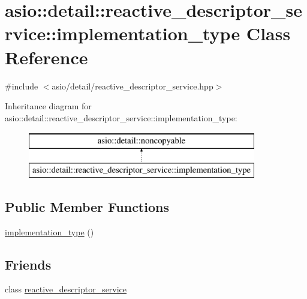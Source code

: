 \hypertarget{classasio_1_1detail_1_1reactive__descriptor__service_1_1implementation__type}{}\section{asio\+:\+:detail\+:\+:reactive\+\_\+descriptor\+\_\+service\+:\+:implementation\+\_\+type Class Reference}
\label{classasio_1_1detail_1_1reactive__descriptor__service_1_1implementation__type}


{\ttfamily \#include $<$asio/detail/reactive\+\_\+descriptor\+\_\+service.\+hpp$>$}

Inheritance diagram for asio\+:\+:detail\+:\+:reactive\+\_\+descriptor\+\_\+service\+:\+:implementation\+\_\+type\+:\begin{figure}[H]
\begin{center}
\leavevmode
\includegraphics[height=2.000000cm]{classasio_1_1detail_1_1reactive__descriptor__service_1_1implementation__type}
\end{center}
\end{figure}
\subsection*{Public Member Functions}
\begin{DoxyCompactItemize}
\item 
\hyperlink{classasio_1_1detail_1_1reactive__descriptor__service_1_1implementation__type_ad0a53d8bb10e3bf8a0db75e5a1f8de75}{implementation\+\_\+type} ()
\end{DoxyCompactItemize}
\subsection*{Friends}
\begin{DoxyCompactItemize}
\item 
class \hyperlink{classasio_1_1detail_1_1reactive__descriptor__service_1_1implementation__type_a9513c10d04bfd7295b1cdfec0f2213a6}{reactive\+\_\+descriptor\+\_\+service}
\end{DoxyCompactItemize}


